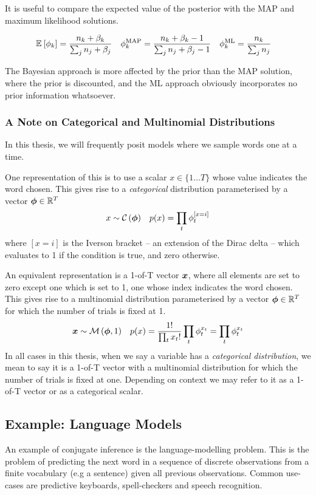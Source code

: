 It is useful to compare the expected value of the posterior with the MAP and maximum likelihood solutions.

\begin{align}
\mathbb{E}_{ {  } }\left[ \phi_k \right]  &= \frac{n_k + \beta_k}{\sum_j n_j + \beta_j} &
\phi_k^{\text{MAP}} &= \frac{n_k + \beta_k - 1}{\sum_j n_j + \beta_j - 1} &
\phi_k^{\text{ML}}  &= \frac{n_k}{\sum_j n_j}
\end{align}

The Bayesian approach is more affected by the prior than the MAP solution, where the prior is discounted, and the ML approach obviously incorporates no prior information whatsoever. 

\subsubsection*{A Note on Categorical and Multinomial Distributions}
In this thesis, we will frequently posit models where we sample words one at a time. 

One representation of this is to use a scalar $x \in \{1 \ldots T\}$ whose value indicates the word chosen. This gives rise to a \emph{categorical} distribution parameterised by a vector $\bm \phi \in { \mathbb{R}^{T} }$
\begin{align}
x &\sim \mathcal{C} \left( {\bm \phi} \right)&
p(x) = \prod_t \phi_t^{[x = i]}
\end{align}
where $[x = i]$ is the Iverson bracket -- an extension of the Dirac delta -- which evaluates to 1 if the condition is true, and zero otherwise. 

An equivalent representation is a 1-of-T vector $\bm x$, where all elements are set to zero except one which is set to 1, one whose index indicates the word chosen. This gives rise to a multinomial distribution parameterised by a vector $\bm \phi \in { \mathbb{R}^{T} }$ for which the number of trials is fixed at 1.
\begin{align}
\bm x &\sim \mathcal{M} \left( {\bm \phi},{1} \right) &
p(x) = \frac{1!}{\prod_t x_t!}\prod_t \phi_t^{x_t} = \prod_t \phi_t^{x_t}
\end{align}
In all cases in this thesis, when we say a variable has a \emph{categorical distribution}, we mean to say it is a 1-of-T vector with a multinomial distribution for which the number of trials is fixed at one. Depending on context we may refer to it as a 1-of-T vector or as a categorical scalar. 

 
\subsection*{Example: Language Models}
 \label{sec:chap1:mackay-lang-model}
An example of conjugate inference is the language-modelling problem. This is the problem of predicting the next word in a sequence of discrete observations from a finite vocabulary (e.g a sentence) given all previous observations. Common use-cases are predictive keyboards, spell-checkers and speech recognition.


